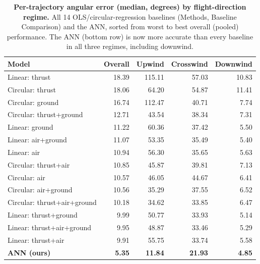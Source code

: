 \documentclass[11pt]{article}
\begin{document}
\begin{table}[h!]
    \centering
    \caption{\textbf{Per-trajectory angular error (median, degrees) by flight-direction regime.} All 14 OLS/circular-regression baselines (Methods, Baseline Comparison) and the ANN, sorted from worst to best overall (pooled) performance. The ANN (bottom row) is now more accurate than every baseline in all three regimes, including downwind.}
    \begin{tabular}{@{}lrrrr@{}}
        \toprule
        Model & Overall & Upwind & Crosswind & Downwind \\
        \midrule
        Linear: thrust & 18.39 & 115.11 & 57.03 & 10.83 \\
        Circular: thrust & 18.06 & 64.20 & 54.87 & 11.41 \\
        Circular: ground & 16.74 & 112.47 & 40.71 & 7.74 \\
        Circular: thrust+ground & 12.71 & 43.54 & 38.34 & 7.31 \\
        Linear: ground & 11.22 & 60.36 & 37.42 & 5.50 \\
        Linear: air+ground & 11.07 & 53.35 & 35.49 & 5.40 \\
        Linear: air & 10.94 & 56.30 & 35.65 & 5.63 \\
        Circular: thrust+air & 10.85 & 45.87 & 39.81 & 7.13 \\
        Circular: air & 10.57 & 46.05 & 44.67 & 6.41 \\
        Circular: air+ground & 10.56 & 35.29 & 37.55 & 6.52 \\
        Circular: thrust+air+ground & 10.18 & 34.62 & 33.85 & 6.47 \\
        Linear: thrust+ground & 9.99 & 50.77 & 33.93 & 5.14 \\
        Linear: thrust+air+ground & 9.95 & 48.87 & 33.46 & 5.29 \\
        Linear: thrust+air & 9.91 & 55.75 & 33.74 & 5.58 \\
        \textbf{ANN (ours)} & \textbf{5.35} & \textbf{11.84} & \textbf{21.93} & \textbf{4.85} \\
        \bottomrule
    \end{tabular}
    \label{tab:baseline_regime}
\end{table}
\end{document}

